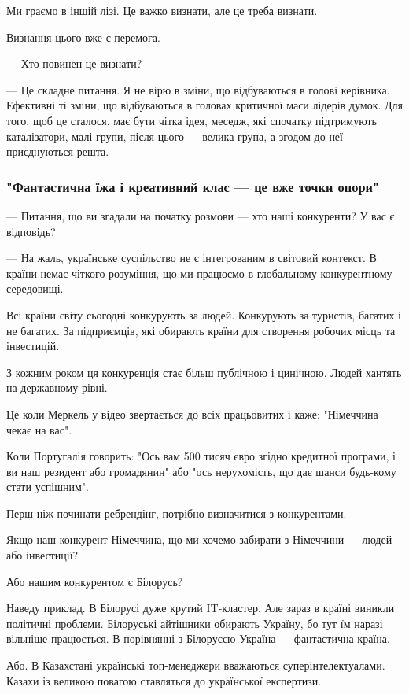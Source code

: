 Ми граємо в іншій лізі. Це важко визнати, але це треба визнати.

Визнання цього вже є перемога.

--- Хто повинен це визнати?

--- Це складне питання. Я не вірю в зміни, що відбуваються в голові керівника.
Ефективні ті зміни, що відбуваються в головах критичної маси лідерів думок. Для
того, щоб це сталося, має бути чітка ідея, меседж, які спочатку підтримують
каталізатори, малі групи, після цього --- велика група, а згодом до неї
приєднуються решта. 

\subsubsection{"Фантастична їжа і креативний клас --- це вже точки опори"}

--- Питання, що ви згадали на початку розмови --- хто наші конкуренти? У вас є
відповідь?

--- На жаль, українське суспільство не є інтегрованим в світовий контекст. В
країни немає чіткого розуміння, що ми працюємо в глобальному конкурентному
середовищі.

Всі країни світу сьогодні конкурують за людей. Конкурують за туристів, багатих
і не багатих. За підприємців, які обирають країни для створення робочих місць
та інвестицій.

З кожним роком ця конкуренція стає більш публічною і цинічною. Людей хантять на державному рівні.

Це коли Меркель у відео звертається до всіх працьовитих і каже: "Німеччина
чекає на вас". 

Коли Португалія говорить: "Ось вам 500 тисяч євро згідно кредитної програми, і
ви наш резидент або громадянин" або "ось нерухомість, що дає шанси будь-кому
стати успішним".

Перш ніж починати ребрендінг, потрібно визначитися з конкурентами.

Якщо наш конкурент Німеччина, що ми хочемо забирати з Німеччини --- людей або інвестиції?

Або нашим конкурентом є Білорусь?

Наведу приклад. В Білорусі дуже крутий IT-кластер. Але зараз в країні виникли
політичні проблеми. Білоруські айтішники обирають Україну, бо тут їм наразі
вільніше працюється. В порівнянні з Білоруссю Україна --- фантастична країна.

Або. В Казахстані українські топ-менеджери вважаються суперінтелектуалами.
Казахи із великою повагою ставляться до української експертизи.

